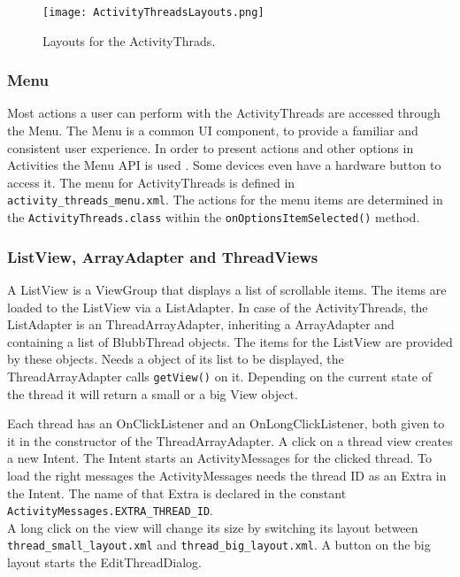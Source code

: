 \documentclass[12pt,a4paper,oneside]{report}
\newcommand{\code}[1]{\lstinline{#1}}
\begin{document}
\begin{figure}[!ht]
	\centering
    \texttt{[image: ActivityThreadsLayouts.png]}
	\caption{Layouts for the ActivityThrads.}
	\label{fig:ActivityThreadsLayouts}
\end{figure}


\subsubsection{Menu}
Most actions a user can perform with the ActivityThreads are accessed through the Menu. The Menu is a common UI component, to provide a familiar and consistent user experience. In order to present actions and other options in Activities the Menu API is used \citep{aDefMenu}. Some devices even have a hardware button to access it. The menu for ActivityThreads is defined in \code{activity_threads_menu.xml}.
 The actions for the menu items are determined in the \code{ActivityThreads.class} within the \code{onOptionsItemSelected()} method.

\subsubsection{ListView, ArrayAdapter and ThreadViews}
A ListView is a ViewGroup that displays a list of scrollable items\citep{aDefListView}. The items are loaded to the ListView via a ListAdapter. In case of the ActivityThreads, the ListAdapter is an ThreadArrayAdapter, inheriting a ArrayAdapter and containing a list of BlubbThread objects. The items for the ListView are provided by these objects. Needs a object of its list to be displayed, the ThreadArrayAdapter calls \code{getView()} on it. Depending on the current state of the thread it will return a small or a big View object. 

Each thread has an OnClickListener and an OnLongClickListener, both given to it in the constructor of the ThreadArrayAdapter. A click on a thread view creates a new Intent.  The Intent starts an ActivityMessages for the clicked thread. To load the right messages the ActivityMessages needs the thread ID as an Extra in the Intent. The name of that Extra is declared in the constant \code{ActivityMessages.EXTRA_THREAD_ID}.\\


A long click on the view will change its size by switching its layout between \code{thread_small_layout.xml} and \code{thread_big_layout.xml}. A button on the big layout starts the EditThreadDialog.\\
\end{document}
